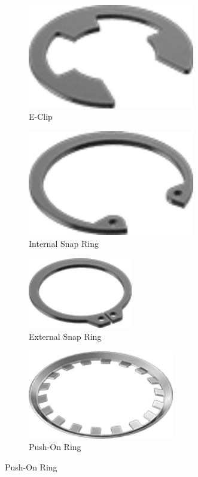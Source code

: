 \documentclass[10pt,letterpaper]{book}
\begin{document}
	\begin{figure}[H]
		\centering
		\begin{subfigure}[b]{.24\linewidth}
			\includegraphics[width=0.8\textwidth]{imgs/eclip.png}
			\caption{E-Clip}
		\end{subfigure}\begin{subfigure}[b]{.24\linewidth}
			\includegraphics[width=0.8\textwidth]{imgs/int_snapring.png}
			\caption{Internal Snap Ring}
		\end{subfigure}\begin{subfigure}[b]{.24\linewidth}
			\includegraphics[width=0.5\textwidth]{imgs/ext_snapring.png}
			\caption{External Snap Ring}
		\end{subfigure}\begin{subfigure}[b]{.24\linewidth}
			\includegraphics[width=0.7\textwidth]{imgs/pushonring.png}
			\caption{Push-On Ring}
		\end{subfigure}
		

\end{figure}
\end{document}
